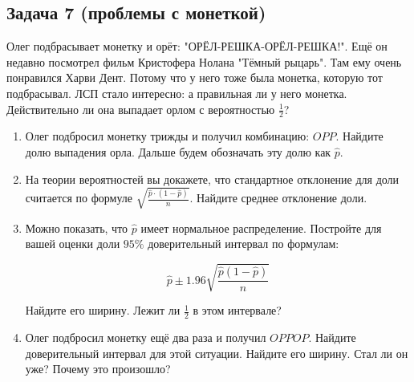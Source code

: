 \documentclass[12pt, a4paper, oneside]{article}
\theoremstyle{plain} %
\theoremstyle{definition}
\begin{document}
\subsection*{Задача 7 (проблемы с монеткой)}

Олег подбрасывает монетку и орёт: "ОРЁЛ-РЕШКА-ОРЁЛ-РЕШКА!". Ещё он недавно посмотрел фильм Кристофера Нолана "Тёмный рыцарь". Там ему очень понравился Харви Дент. Потому что у него тоже была монетка, которую тот подбрасывал. ЛСП стало интересно: а правильная ли у него монетка. Действительно ли она выпадает орлом с вероятностью $\frac{1}{2}$? 

\begin{enumerate}
	\item  Олег подбросил монетку трижды и получил комбинацию: $OPP$. Найдите долю выпадения орла.  Дальше будем обозначать эту долю как $\hat p$. 
	
	\item  На теории вероятностей вы докажете, что стандартное отклонение для доли считается по формуле $ \sqrt{\frac{\hat p \cdot (1 - \hat p)}{n}}.$ Найдите среднее отклонение доли. 
	
	\item Можно показать, что $\hat p$ имеет нормальное распределение. Постройте для вашей оценки доли $95\%$ доверительный интервал по формулам: 
	
	$$\hat{p}\pm 1.96 \sqrt{\frac{\hat{p}\left(1-\hat{p}\right)}{n}}$$
	
	Найдите его ширину.  Лежит ли $\frac{1}{2}$ в этом интервале? 
	
	\item Олег подбросил монетку ещё два раза и получил $OPPOP$. Найдите доверительный интервал для этой ситуации. Найдите его ширину. Стал ли он уже? Почему это произошло? 
\end{enumerate}

\end{document}
